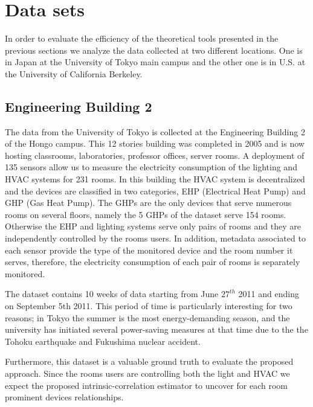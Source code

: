 \section{Data sets}
In order to evaluate the efficiency of the theoretical tools presented in the previous sections we analyze the data collected at two different locations.
One is in Japan at the University of Tokyo main campus and the other one is in U.S. at the University of California Berkeley.

\subsection{Engineering Building 2} \label{data:engbldg2}
The data from the University of Tokyo is collected at the Engineering Building 2 of the Hongo campus. 
This 12 stories building was completed in 2005 and is now hosting classrooms, laboratories, professor offices, server rooms.
A deployment of 135 sensors allow us to measure the electricity consumption of the lighting and HVAC systems for 231 rooms.
In this building the HVAC system is decentralized and the devices are classified in two categories, EHP (Electrical Heat Pump) and GHP (Gas Heat Pump).
The GHPs are the only devices that serve numerous rooms on several floors, namely the 5 GHPs of the dataset serve 154 rooms.
Otherwise the EHP and lighting systems serve only pairs of rooms and they are independently controlled by the rooms users.
In addition, metadata associated to each sensor provide the type of the monitored device and the room number it serves, therefore, the electricity consumption of each pair of rooms is separately monitored.

The dataset contains 10 weeks of data starting from June $27^{th}$ 2011 and ending on September 5th 2011.
This period of time is particularly interesting for two reasons; in Tokyo the summer is the most energy-demanding season, and the university has initiated several power-saving measures at that time due to the the Tohoku earthquake and Fukushima nuclear accident.

Furthermore, this dataset is a valuable ground truth to evaluate the proposed approach.
Since the rooms users are controlling both the light and HVAC we expect the proposed intrinsic-correlation estimator to uncover for each room prominent devices relationships.

